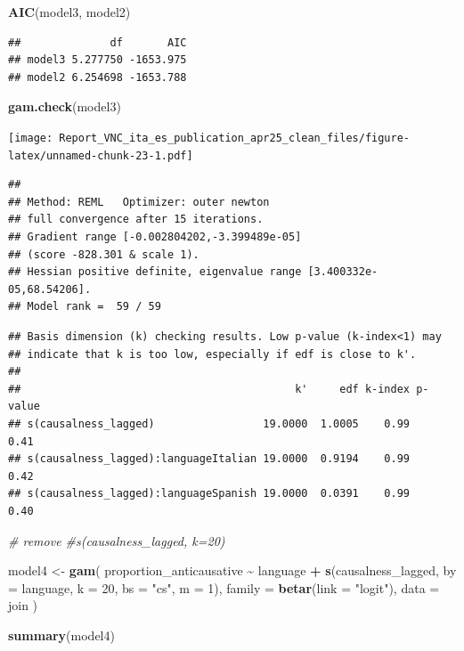 \documentclass[
]{article}
\newenvironment{Shaded}{\begin{snugshade}}{\end{snugshade}}
\newcommand{\AttributeTok}[1]{\textcolor[rgb]{0.13,0.29,0.53}{#1}}
\newcommand{\CommentTok}[1]{\textcolor[rgb]{0.56,0.35,0.01}{\textit{#1}}}
\newcommand{\DecValTok}[1]{\textcolor[rgb]{0.00,0.00,0.81}{#1}}
\newcommand{\FunctionTok}[1]{\textcolor[rgb]{0.13,0.29,0.53}{\textbf{#1}}}
\newcommand{\NormalTok}[1]{#1}
\newcommand{\OtherTok}[1]{\textcolor[rgb]{0.56,0.35,0.01}{#1}}
\newcommand{\SpecialCharTok}[1]{\textcolor[rgb]{0.81,0.36,0.00}{\textbf{#1}}}
\newcommand{\StringTok}[1]{\textcolor[rgb]{0.31,0.60,0.02}{#1}}
\begin{document}
\begin{Shaded}
\begin{Highlighting}[]
\FunctionTok{AIC}\NormalTok{(model3, model2)}
\end{Highlighting}
\end{Shaded}

\begin{verbatim}
##              df       AIC
## model3 5.277750 -1653.975
## model2 6.254698 -1653.788
\end{verbatim}

\begin{Shaded}
\begin{Highlighting}[]
\FunctionTok{gam.check}\NormalTok{(model3)}
\end{Highlighting}
\end{Shaded}

\texttt{[image: Report\_VNC\_ita\_es\_publication\_apr25\_clean\_files/figure-latex/unnamed-chunk-23-1.pdf]}

\begin{verbatim}
## 
## Method: REML   Optimizer: outer newton
## full convergence after 15 iterations.
## Gradient range [-0.002804202,-3.399489e-05]
## (score -828.301 & scale 1).
## Hessian positive definite, eigenvalue range [3.400332e-05,68.54206].
## Model rank =  59 / 59
\end{verbatim}

\begin{verbatim}
## Basis dimension (k) checking results. Low p-value (k-index<1) may
## indicate that k is too low, especially if edf is close to k'.
## 
##                                           k'     edf k-index p-value
## s(causalness_lagged)                 19.0000  1.0005    0.99    0.41
## s(causalness_lagged):languageItalian 19.0000  0.9194    0.99    0.42
## s(causalness_lagged):languageSpanish 19.0000  0.0391    0.99    0.40
\end{verbatim}

\begin{Shaded}
\begin{Highlighting}[]
\CommentTok{\# remove \#s(causalness\_lagged, k=20)}
 
\NormalTok{model4 }\OtherTok{\textless{}{-}} \FunctionTok{gam}\NormalTok{(}
\NormalTok{  proportion\_anticausative }\SpecialCharTok{\textasciitilde{}} 
\NormalTok{    language }\SpecialCharTok{+}
    \FunctionTok{s}\NormalTok{(causalness\_lagged, }\AttributeTok{by =}\NormalTok{ language, }\AttributeTok{k =} \DecValTok{20}\NormalTok{, }\AttributeTok{bs =} \StringTok{"cs"}\NormalTok{, }\AttributeTok{m =} \DecValTok{1}\NormalTok{),}
  \AttributeTok{family =} \FunctionTok{betar}\NormalTok{(}\AttributeTok{link =} \StringTok{"logit"}\NormalTok{),                 }
  \AttributeTok{data =}\NormalTok{ join}
\NormalTok{)}

\FunctionTok{summary}\NormalTok{(model4)}
\end{Highlighting}
\end{Shaded}
\end{document}
